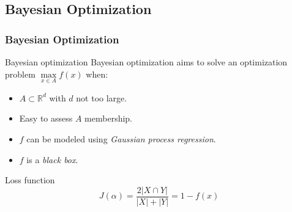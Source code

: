 \subsection{Bayesian Optimization}
\begin{frame}
    \frametitle{Bayesian Optimization}
     {
        \begin{block}{Bayesian optimization}
            Bayesian optimization aims to solve an optimization problem $\max\limits_{x\in A}f\left(x\right)$ when:
            \begin{itemize}
                \item $A \subset \mathbb{R}^d$ with $d$ not too large.
                \item Easy to assess $A$ membership.
                \item $f$ can be modeled using \emph{Gaussian process regression}.
                \item $f$ is a \emph{black box}.
            \end{itemize}
        \end{block}
    }
     {
        \begin{exampleblock}{Loss function}
            \begin{equation*}
                J\left(\alpha\right) = \frac{2\lvert X \cap Y \rvert}{\lvert X \rvert + \lvert Y \rvert} = 1-f(x)
            \end{equation*}
        \end{exampleblock}
    }
\end{frame}

